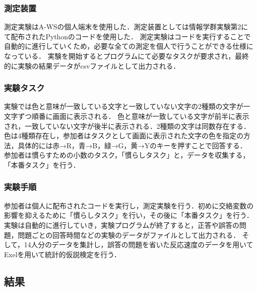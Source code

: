 \documentclass[titlepage]{jlreq}
\begin{document}
\subsubsection{測定装置}
測定実験はA-WSの個人端末を使用した．測定装置としては情報学群実験第2にて配布されたPythonのコードを使用した．
測定実験はコードを実行することで自動的に進行していくため，必要な全ての測定を個人で行うことができる仕様になっている．
実験を開始するとプログラムにて必要なタスクが要求され，最終的に実験の結果データがcsvファイルとして出力される．

\subsubsection{実験タスク}
実験では色と意味が一致している文字と一致していない文字の2種類の文字が一文字ずつ順番に画面に表示される．
色と意味が一致している文字が前半に表示され，一致していない文字が後半に表示される．2種類の文字は同数存在する．
色は4種類存在し，参加者はタスクとして画面に表示された文字の色を指定の方法，具体的には赤→R，青→B，緑→G，黄→Yのキーを押すことで回答する．
参加者は慣らすための小数のタスク，「慣らしタスク」と，データを収集する，「本番タスク」を行う．

\subsubsection{実験手順}
参加者は個人に配布されたコードを実行し，測定実験を行う．初めに交絡変数の影響を抑えるために「慣らしタスク」を行い，その後に「本番タスク」を行う．
実験は自動的に進行していき，実験プログラムが終了すると，正答や誤答の問題，問題ごとの回答時間などの実験のデータがファイルとして出力される．
そして，14人分のデータを集計し，誤答の問題を省いた反応速度のデータを用いてExelを用いて統計的仮説検定を行う．

\subsection{結果}

\end{document}

